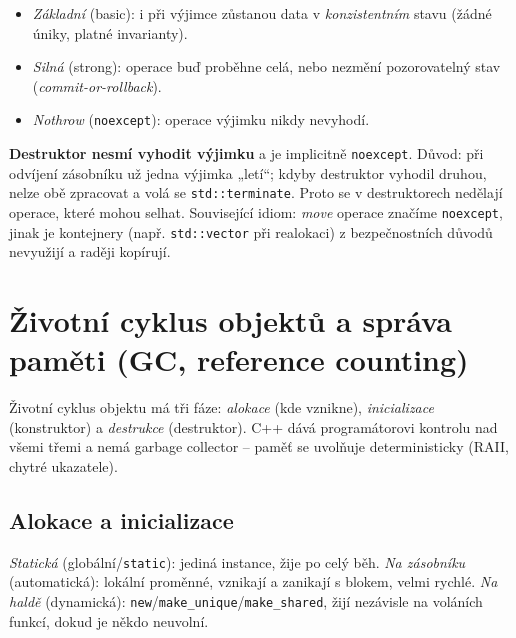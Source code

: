\documentclass[11pt,a4paper]{article}
\newcommand{\cd}{\lstinline[style=cpp]}
\begin{document}
\begin{definice}
\begin{itemize}
  \item \emph{Základní} (basic): i při výjimce zůstanou data v \emph{konzistentním} stavu (žádné úniky, platné invarianty).
  \item \emph{Silná} (strong): operace buď proběhne celá, nebo nezmění pozorovatelný stav (\emph{commit-or-rollback}).
  \item \emph{Nothrow} (\cd{noexcept}): operace výjimku nikdy nevyhodí.
\end{itemize}
\end{definice}

\begin{poznamka}
\textbf{Destruktor nesmí vyhodit výjimku} a je implicitně \cd{noexcept}. Důvod: při odvíjení zásobníku už jedna výjimka „letí``; kdyby destruktor vyhodil druhou, nelze obě zpracovat a volá se \cd{std::terminate}. Proto se v destruktorech nedělají operace, které mohou selhat. Související idiom: \emph{move} operace značíme \cd{noexcept}, jinak je kontejnery (např. \cd{std::vector} při realokaci) z bezpečnostních důvodů nevyužijí a raději kopírují.
\end{poznamka}

\section{Životní cyklus objektů a správa paměti (GC, reference counting)}

Životní cyklus objektu má tři fáze: \emph{alokace} (kde vznikne), \emph{inicializace} (konstruktor) a \emph{destrukce} (destruktor). C++ dává programátorovi kontrolu nad všemi třemi a nemá garbage collector -- paměť se uvolňuje deterministicky (RAII, chytré ukazatele).

\subsection{Alokace a inicializace}

\begin{poznamka}
\emph{Statická} (globální/\cd{static}): jediná instance, žije po celý běh. \emph{Na zásobníku} (automatická): lokální proměnné, vznikají a zanikají s blokem, velmi rychlé. \emph{Na haldě} (dynamická): \cd{new}/\cd{make_unique}/\cd{make_shared}, žijí nezávisle na voláních funkcí, dokud je někdo neuvolní.
\end{poznamka}
\end{document}
